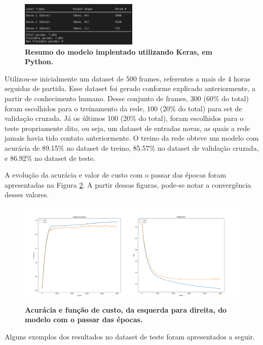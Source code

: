 \documentclass[10pt,fleqn,a4paper]{article}
\begin{document}
\begin{figure}[H]
\centering
\includegraphics[width=0.5\textwidth]{figures/model-summary.jpeg}
\caption{\textbf{Resumo do modelo implentado utilizando Keras, em Python.}} \label{fig:model-summary}
\end{figure}

	Utilizou-se inicialmente um dataset de 500 frames, referentes a mais de 4 horas seguidas de partida. Esse dataset foi gerado conforme explicado anteriormente, a partir de conhecimento humano. Desse conjunto de frames, 300 (60\% do total) foram escolhidos para o treinamento da rede, 100 (20\% do total) para set de validação cruzada. Já os últimos 100 (20\% do total), foram escolhidos para o teste propriamente dito, ou seja, um dataset de entradas novas, as quais a rede jamais havia tido contato anteriormente. O treino da rede obteve um modelo com acurácia de 89.15\% no dataset de treino, 85.57\% no dataset de validação cruzada, e 86.92\% no dataset de teste.
	
	A evolução da acurácia e valor de custo com o passar das épocas foram apresentadas na Figura \ref{fig:acc-loss}. A partir dessas figuras, pode-se notar a convergência desses valores.
	
\begin{figure}[H]
	\centering
	\includegraphics[width=1.05\textwidth]{figures/model-accuracy-loss.png}
   \caption{\textbf{Acurácia e função de custo, da esquerda para direita, do modelo com o passar das épocas.}} \label{fig:acc-loss}
\end{figure}
	
	Alguns exemplos dos resultados no dataset de teste foram apresentados a seguir.
\end{document}
